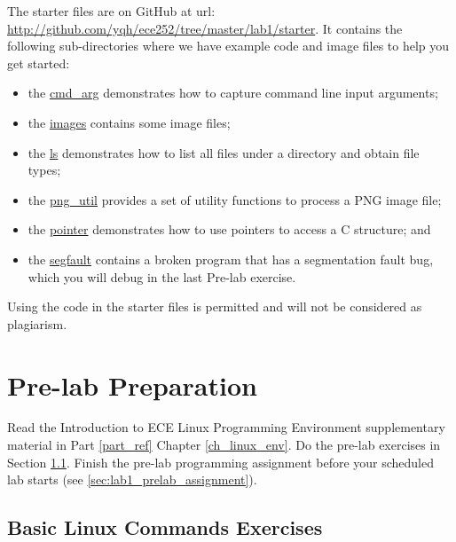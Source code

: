 The starter files are on GitHub at url: \url{http://github.com/yqh/ece252/tree/master/lab1/starter}.
It contains the following sub-directories where we have example code and image files to help you get started:
\begin{itemize}
    \item the \href{http://github.com/yqh/ece252/tree/master/lab1/starter/cmd_arg}{cmd\_arg} demonstrates how to capture command line input arguments;
    \item the \href{http://github.com/yqh/ece252/tree/master/lab1/starter/images}{images} contains some image files;
    \item the \href{http://github.com/yqh/ece252/tree/master/lab1/starter/ls}{ls} demonstrates how to list all files under a directory and obtain file types;
    \item the \href{http://github.com/yqh/ece252/tree/master/lab1/starter/png_util}{png\_util} provides a set of utility functions to process a PNG image file;
    \item the \href{http://github.com/yqh/ece252/tree/master/lab1/starter/pointer}{pointer} demonstrates how to use pointers to access a C structure; and
    \item the \href{http://github.com/yqh/ece252/tree/master/lab1/starter/segfault}{segfault} contains a broken program that has a segmentation fault bug, which you will debug in the last Pre-lab exercise.
\end{itemize}
Using the code in the starter files is permitted and will not be considered as plagiarism.

\section{Pre-lab Preparation}

Read the Introduction to ECE Linux Programming Environment supplementary material in Part \ref{part_ref} Chapter \ref{ch_linux_env}. Do the pre-lab exercises in Section \ref{sec_ex1}. Finish the pre-lab programming assignment before your scheduled lab starts (see \ref{sec:lab1_prelab_assignment}).
\subsection{Basic Linux Commands Exercises}
\label{sec_ex1}


